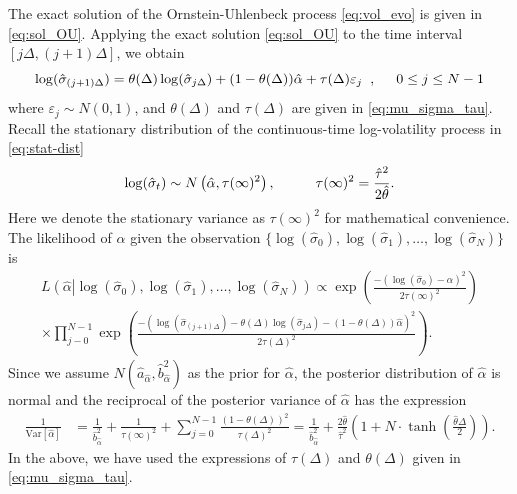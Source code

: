 \documentclass[10pt]{article}
\newcommand{\Var}[1]{\mbox{Var}\left[#1\right]}
\begin{document}
The exact solution of the Ornstein-Uhlenbeck process \eqref{eq:vol_evo} is given in \eqref{eq:sol_OU}.  Applying the exact solution \eqref{eq:sol_OU} to the time interval $[j\Delta, (j+1)\Delta]$, we obtain
$$
  \log( \hat{ \sigma }_{(j+1)\Delta}) = \theta(\Delta) \log( \hat{ \sigma}_{j\Delta}) + (1-\theta(\Delta)) \hat{\alpha} +  \tau(\Delta) \varepsilon_j \;\; , \hspace{0.5cm} 0\le j \le N-1
$$
where $\varepsilon_j \sim N(0, 1)$, and $\theta(\Delta)$ and $\tau(\Delta)$ are given in \eqref{eq:mu_sigma_tau}.  Recall the stationary distribution of the continuous-time log-volatility process in \eqref{eq:stat-dist}
$$
  \log(\hat{\sigma}_t) \sim N \left( \hat{\alpha} , \tau(\infty)^2 \right), \hspace*{1cm} \tau(\infty)^2 = \frac{\hat{\tau}^2}{2\hat{\theta}}.
$$
Here we denote the stationary variance as $\tau(\infty)^2$ for mathematical convenience.  The likelihood of $\hat{\alpha} $ given the observation $\{\log(\hat{\sigma}_0), \log(\hat{\sigma}_1), \ldots, \log(\hat{\sigma}_N)\}$ is
\begin{multline}\label{likelihood_alpha_n1}
L \left(\hat{\alpha} \left| \log(\hat{\sigma}_0), \log(\hat{\sigma}_1), \ldots, \log(\hat{\sigma}_N) \right. \right) \propto \exp\left( \frac{-(\log(\hat{\sigma}_0)-\hat{\alpha})^2}{2 \tau(\infty)^2} \right)  \\
%
 \times \prod_{j-0}^{N-1} \exp\left( \frac{-\left(\log\left(\hat{\sigma}_{(j+1)\Delta}\right) - \theta(\Delta) \log(\hat{\sigma}_{j\Delta})-(1-\theta(\Delta)) \hat{\alpha}\right)^2}{2 \tau(\Delta)^2} \right).
\end{multline}
Since we assume $N(\hat{a}_{\hat{\alpha}}, \hat{b}^2_{\hat{\alpha}})$ as the prior for $\hat{\alpha}$, the posterior distribution of $\hat{\alpha}$ is normal and the reciprocal of the posterior variance of $\hat{\alpha}$ has the expression
\begin{align}
  \frac{1}{\Var{\hat{\alpha}} } &= \frac{1}{\hat{b}^2_{\hat{\alpha}}}  + \frac{1}{\tau(\infty)^2} + \sum_{j=0}^{N-1} \frac{(1-\theta(\Delta))^2}{\tau(\Delta)^2}  %
                                            = \frac{1}{\hat{b}^2_{\hat{\alpha}} }+ \frac{2\hat{\theta} }{\hat{\tau}^2} \left(1 + N \cdot \tanh\left(\frac{\hat{\theta} \Delta}{2} \right) \right).  \label{var_alpha_n1}
\end{align}
In the above, we have used the expressions of $\tau(\Delta )$ and $\theta(\Delta )$ given in \eqref{eq:mu_sigma_tau}.
\end{document}
